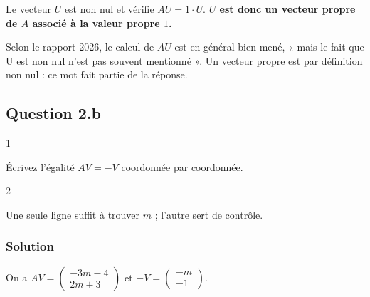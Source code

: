 \documentclass[11pt,a4paper]{article}
\newcommand{\equationajustee}[1]{%
  \sbox{\boiteequation}{$\displaystyle #1$}%
  \ifdim\wd\boiteequation>\linewidth
    \[\resizebox{\linewidth}{!}{\usebox{\boiteequation}}\]%
  \else
    \[#1\]%
  \fi}
\begin{document}
\equationajustee{\begin{aligned}
AU&=\begin{pmatrix}(-3)(-1)+(-4)(1)\\2(-1)+3(1)\end{pmatrix}\\
&=\begin{pmatrix}-1\\1\end{pmatrix}=U.
\end{aligned}}

Le vecteur \(U\) est non nul et vérifie \(AU=1\cdot U\). \textbf{\(U\) est donc un vecteur propre de \(A\) associé à la valeur propre \(1\).}

\begin{jury}

Selon le rapport 2026, le calcul de \(AU\) est en général bien mené, « mais le fait que U est non nul n'est pas souvent mentionné ». Un vecteur propre est par définition non nul : ce mot fait partie de la réponse.

\end{jury}

\hypertarget{question-2.b}{%
\subsection{Question 2.b}\label{question-2.b}}

\begin{indication}{1}

Écrivez l'égalité \(AV=-V\) coordonnée par coordonnée.

\end{indication}

\begin{indication}{2}

Une seule ligne suffit à trouver \(m\) ; l'autre sert de contrôle.

\end{indication}

\hypertarget{solution-2}{%
\subsubsection{Solution}\label{solution-2}}

On a \(AV=\begin{pmatrix}-3m-4\\2m+3\end{pmatrix}\) et \(-V=\begin{pmatrix}-m\\-1\end{pmatrix}\).
\end{document}
